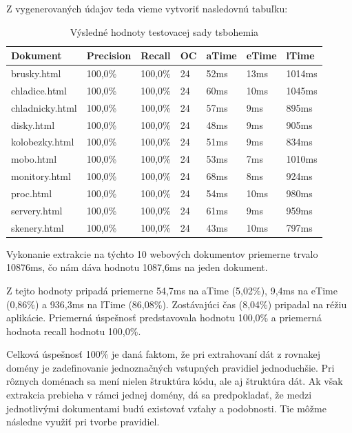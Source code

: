 \bigskip

Z vygenerovaných údajov teda vieme vytvoriť nasledovnú tabuľku:

\begin{table}[hbt]
\caption{Výsledné hodnoty testovacej sady tsbohemia}
\centering
\begin{tabular}{|l|l|l|l|l|l|l|}
\hline
Dokument        & Precision & Recall  & OC & aTime & eTime & lTime  \\ \hline
brusky.html     & 100,0\%   & 100,0\% & 24 & 52ms  & 13ms  & 1014ms \\ \hline
chladice.html   & 100,0\%   & 100,0\% & 24 & 60ms  & 10ms  & 1045ms \\ \hline
chladnicky.html & 100,0\%   & 100,0\% & 24 & 57ms  & 9ms   & 895ms  \\ \hline
disky.html      & 100,0\%   & 100,0\% & 24 & 48ms  & 9ms   & 905ms  \\ \hline
kolobezky.html  & 100,0\%   & 100,0\% & 24 & 51ms  & 9ms   & 834ms  \\ \hline
mobo.html       & 100,0\%   & 100,0\% & 24 & 53ms  & 7ms   & 1010ms \\ \hline
monitory.html   & 100,0\%   & 100,0\% & 24 & 68ms  & 8ms   & 924ms  \\ \hline
proc.html       & 100,0\%   & 100,0\% & 24 & 54ms  & 10ms  & 980ms  \\ \hline
servery.html    & 100,0\%   & 100,0\% & 24 & 61ms  & 9ms   & 959ms  \\ \hline
skenery.html    & 100,0\%   & 100,0\% & 24 & 43ms  & 10ms  & 797ms  \\ \hline
\end{tabular}
\end{table}

Vykonanie extrakcie na týchto 10 webových dokumentov priemerne trvalo 10876ms, čo nám dáva hodnotu 1087,6ms na jeden dokument. 

Z tejto hodnoty pripadá priemerne 54,7ms na aTime (5,02\%), 9,4ms na eTime (0,86\%) a 936,3ms na lTime (86,08\%). Zostávajúci čas (8,04\%) pripadal na réžiu aplikácie. Priemerná úspešnosť predstavovala hodnotu 100,0\% a priemerná hodnota recall hodnotu 100,0\%. 

\bigskip

Celková úspešnosť 100\% je daná faktom, že pri extrahovaní dát z rovnakej domény je zadefinovanie jednoznačných vstupných pravidiel jednoduchšie. Pri rôznych doménach sa mení nielen štruktúra kódu, ale aj štruktúra dát. Ak však extrakcia prebieha v rámci jednej domény, dá sa predpokladať, že medzi jednotlivými dokumentami budú existovať vzťahy a podobnosti. Tie môžme následne využiť pri tvorbe pravidiel.

